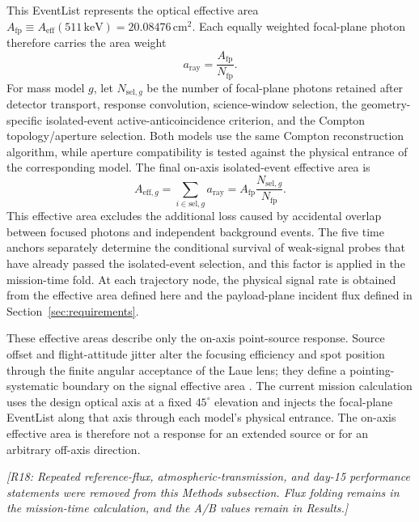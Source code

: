 \documentclass[11pt]{article}
\newcommand{\revdeleted}[1]{\par\noindent\textcolor{revisionblue}{\small\itshape [#1]}\par}
\newcommand{\keV}{\ensuremath{\,\mathrm{keV}}}
\begin{document}
This EventList represents the optical effective area
$A_{\mathrm{fp}}\equiv A_{\mathrm{eff}}(511\keV)=20.08476\,\mathrm{cm^2}$.
Each equally weighted focal-plane photon therefore carries the area weight
\begin{equation}
 a_{\mathrm{ray}}=\frac{A_{\mathrm{fp}}}{N_{\mathrm{fp}}}.
 \label{eq:focal_eventlist_area_weight}
\end{equation}
For mass model $g$, let $N_{\mathrm{sel},g}$ be the number of focal-plane
photons retained after detector transport, response convolution, science-window
selection, the geometry-specific isolated-event active-anticoincidence
criterion, and the Compton topology/aperture selection. Both models use the
same Compton reconstruction algorithm, while aperture compatibility is tested
against the physical entrance of the corresponding model. The final on-axis
isolated-event effective area is
\begin{equation}
 A_{\mathrm{eff},g}
 =\sum_{i\in\mathrm{sel},g}a_{\mathrm{ray}}
 =A_{\mathrm{fp}}\frac{N_{\mathrm{sel},g}}{N_{\mathrm{fp}}}.
 \label{eq:selected_signal_effective_area}
\end{equation}
This effective area excludes the additional loss caused by accidental overlap
between focused photons and independent background events. The five time
anchors separately determine the conditional survival of weak-signal probes
that have already passed the isolated-event selection, and this factor is
applied in the mission-time fold. At each trajectory node, the physical signal
rate is obtained from the effective area defined here and the payload-plane
incident flux defined in Section~\ref{sec:requirements}.

These effective areas describe only the on-axis point-source response. Source
offset and flight-attitude jitter alter the focusing efficiency and spot
position through the finite angular acceptance of the Laue lens; they define a
pointing-systematic boundary on the signal effective area
\cite{Barriere2009Laue,Weidenspointner2006MAX}. The current mission calculation
uses the design optical axis at a fixed $45^\circ$ elevation and injects the
focal-plane EventList along that axis through each model's physical entrance.
The on-axis effective area is therefore not a response for an extended source
or for an arbitrary off-axis direction.
\endgroup

\revdeleted{R18: Repeated reference-flux, atmospheric-transmission, and day-15
performance statements were removed from this Methods subsection. Flux folding
remains in the mission-time calculation, and the A/B values remain in Results.}
\end{document}
